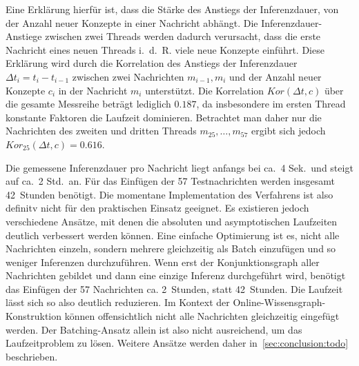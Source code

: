 Eine Erklärung hierfür ist, dass die Stärke des Anstiegs der Inferenzdauer, von der Anzahl neuer Konzepte in einer Nachricht abhängt.
Die Inferenzdauer-Anstiege zwischen zwei Threads werden dadurch verursacht, dass die erste Nachricht eines neuen Threads i.~d.~R. viele neue Konzepte einführt.
Diese Erklärung wird durch die Korrelation des Anstiegs der Inferenzdauer $\Delta t_i = t_i - t_{i - 1}$ zwischen zwei Nachrichten $m_{i - 1}, m_i$ und der Anzahl neuer Konzepte $c_i$ in der Nachricht $m_i$ unterstützt.
Die Korrelation $Kor(\Delta t, c)$ über die gesamte Messreihe beträgt lediglich $0.187$, da insbesondere im ersten Thread konstante Faktoren die Laufzeit dominieren.
Betrachtet man daher nur die Nachrichten des zweiten und dritten Threads $m_{25}, \dots, m_{57}$ ergibt sich jedoch $Kor_{25}(\Delta t, c) = 0.616$.

Die gemessene Inferenzdauer pro Nachricht liegt anfangs bei ca.\ 4 Sek.\ und steigt auf ca.\ 2 Std.\ an.
Für das Einfügen der 57 Testnachrichten werden insgesamt 42~Stunden benötigt.
Die momentane Implementation des Verfahrens ist also definitv nicht für den praktischen Einsatz geeignet.
Es existieren jedoch verschiedene Ansätze, mit denen die absoluten und asymptotischen Laufzeiten deutlich verbessert werden können.
Eine einfache Optimierung ist es, nicht alle Nachrichten einzeln, sondern mehrere gleichzeitig als Batch einzufügen und so weniger Inferenzen durchzuführen.
Wenn erst der Konjunktionsgraph aller Nachrichten gebildet und dann eine einzige Inferenz durchgeführt wird, benötigt das Einfügen der 57 Nachrichten ca. 2~Stunden, statt 42~Stunden.
Die Laufzeit lässt sich so also deutlich reduzieren.
Im Kontext der Online-Wissensgraph-Konstruktion können offensichtlich nicht alle Nachrichten gleichzeitig eingefügt werden.
Der Batching-Ansatz allein ist also nicht ausreichend, um das Laufzeitproblem zu lösen.
Weitere Ansätze werden daher in~\ref{sec:conclusion:todo} beschrieben.

